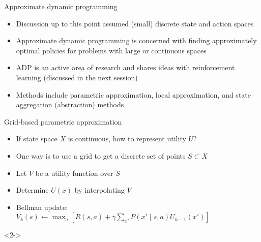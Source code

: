 \documentclass[handout]{dmu}
\begin{document}
\begin{frame}{Approximate dynamic programming}
\begin{itemize}
\item<1-> Discussion up to this point assumed (small) discrete state and action spaces
\item <2-> \alert<2>{Approximate dynamic programming} is concerned with finding approximately optimal policies for problems with large or continuous spaces
\item <3-> ADP is an \alert<3>{active} area of research and shares ideas with \alert<3>{reinforcement learning} (discussed in the next session)
\item <4-> Methods include parametric approximation, local approximation, and state aggregation (abstraction) methods
\end{itemize}
\end{frame}

\begin{frame}{Grid-based parametric approximation}
\begin{itemize}
\item<1-> If state space $X$ is continuous, how to represent utility $U$?
\item <2-> One way is to use a grid to get a discrete set of points $S \subset X$
\item <3-> Let $V$ be a utility function over $S$
\item <4-> Determine $U(x)$ by \alert<4>{interpolating} $V$
\item <5-> Bellman update: $V_k(s) \leftarrow \max_a [R(s, a) + \gamma \sum_{x'} P(x' \mid s, a) U_{k-1}(x')]$
\end{itemize}
\begin{center}
\begin{uncoverenv}<2->
\end{uncoverenv}
\end{center}
\end{frame}
\end{document}
